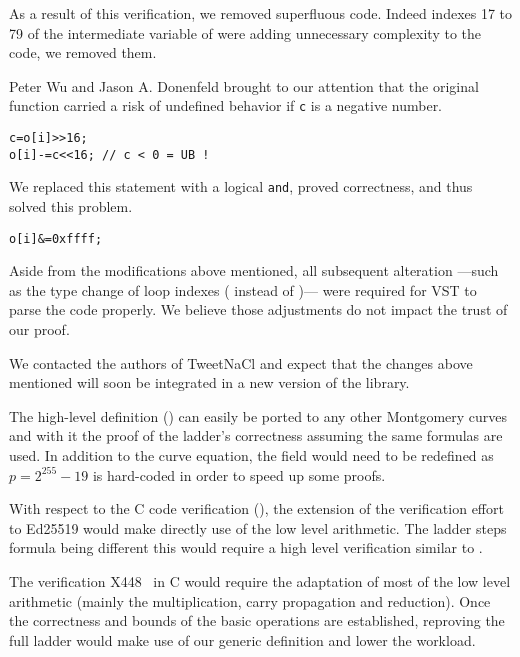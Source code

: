 As a result of this verification, we removed superfluous code.
Indeed indexes 17 to 79 of the  intermediate variable of
 were adding unnecessary complexity to the code,
we removed them.

Peter Wu and Jason A. Donenfeld brought to our attention that the original
 function carried a risk of undefined behavior if \texttt{c}
is a negative number.
\begin{lstlisting}[language=Ctweetnacl,stepnumber=0]
c=o[i]>>16;
o[i]-=c<<16; // c < 0 = UB !
\end{lstlisting}
We replaced this statement with a logical \texttt{and}, proved correctness,
and thus solved this problem.
\begin{lstlisting}[language=Ctweetnacl,stepnumber=0]
o[i]&=0xffff;
\end{lstlisting}

Aside from the modifications above mentioned, all subsequent alteration
---such as the type change of loop indexes ( instead of )---
were required for VST to parse the code properly. We believe those
adjustments do not impact the trust of our proof.

We contacted the authors of TweetNaCl and expect that the changes above
mentioned will soon be integrated in a new version of the library.

The high-level definition () can easily be ported to any
other Montgomery curves and with it the proof of the ladder's correctness
assuming the same formulas are used.
In addition to the curve equation, the field  would need to be redefined
as $p=2^{255}-19$ is hard-coded in order to speed up some proofs.

With respect to the C code verification (), the extension of
the verification effort to Ed25519 would make directly use of the low level
arithmetic. The ladder steps formula being different this would require a high
level verification similar to .

The verification \eg X448~\cite{cryptoeprint:2015:625,rfc7748} in C would
require the adaptation of most of the low level arithmetic (mainly the
multiplication, carry propagation and reduction).
Once the correctness and bounds of the basic operations are established,
reproving the full ladder would make use of our generic definition and lower
the workload.

